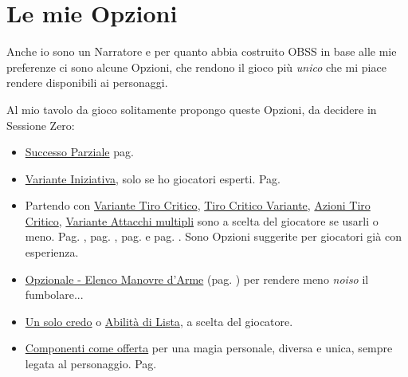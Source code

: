 \section{Le mie Opzioni}

\normalsize

Anche io sono un Narratore e per quanto abbia costruito OBSS in base alle mie preferenze ci sono alcune Opzioni, che rendono il gioco più \emph{unico} che mi piace rendere disponibili ai personaggi.

Al mio tavolo da gioco solitamente propongo queste Opzioni, da decidere in Sessione Zero:

\begin{itemize}[leftmargin=*] \setlength{\itemsep}{0pt}

\item
\hyperlink{successoparziale}{Successo Parziale} pag. \pageref{successoparziale}

\item
\hyperlink{varianteiniziativa}{Variante Iniziativa}, solo se ho giocatori esperti. Pag. \pageref{varianteiniziativa}

\item
Partendo con \hyperlink{variantetiricritici}{Variante Tiro Critico}, \hyperlink{tirocriticovariante}{Tiro Critico Variante}, \hyperlink{OpzionaleAzioniTiroCritico}{Azioni Tiro Critico}, \hyperlink{varianteattacchimultipli}{Variante Attacchi multipli} sono a scelta del giocatore se usarli o meno. Pag. \pageref{tirocriticovariante}, pag. \pageref{OpzionaleAzioniTiroCritico}, pag. \pageref{variantetiricritici} e pag. \pageref{varianteattacchimultipli}. Sono Opzioni suggerite per giocatori già con esperienza.

\item \hyperlink{elencotalentiarmi}{Opzionale - Elenco Manovre d'Arme} (pag. \pageref{elencotalentiarmi}) per rendere meno \emph{noiso} il fumbolare...


\item
\hyperlink{Un solo credo}{Un solo credo} o \hyperlink{abilitadilista}{Abilità di Lista}, a scelta del giocatore.

\item
\hyperlink{componenticomeofferta}{Componenti come offerta} per una magia personale, diversa e unica, sempre legata al personaggio. Pag. \pageref{componenticomeofferta}


\end{itemize}
